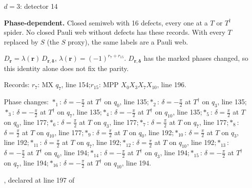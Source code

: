 \label{d3_det014}
{\Large $d=3$: detector 14}\par
\textbf{Phase-dependent.} Closed semiweb with 16 defects, every one at a $T$ or $T^\dagger$ spider. No closed Pauli web without defects has these records. With every $T$ replaced by $S$ (the $S$ proxy), the same labels are a Pauli web.
\begin{center}
\end{center}
\vspace{-1mm}
$D_{\boldsymbol r}=\lambda(\boldsymbol r)\,D_{\boldsymbol r,\boldsymbol\delta}$, \quad $\lambda(\boldsymbol r)=(-1)^{r_{7}+r_{15}}$. \qquad $D_{\boldsymbol r,\boldsymbol\delta}$ has the marked phases changed, so this identity alone does not fix the parity.
\par\smallskip\begin{minipage}{.98\linewidth}\small Records: $r_{7}$: MX $q_{7}$, line 154;\quad $r_{15}$: MPP $X_{0}X_{3}X_{7}X_{10}$, line 196.\end{minipage}
\par\smallskip\begin{minipage}{.98\linewidth}\small Phase changes: $\ast_{1}$: $\delta=-\frac{\pi}{2}$ at $T^\dagger$ on $q_{0}$, line 135;\quad $\ast_{2}$: $\delta=-\frac{\pi}{2}$ at $T^\dagger$ on $q_{3}$, line 135;\quad $\ast_{3}$: $\delta=-\frac{\pi}{2}$ at $T^\dagger$ on $q_{7}$, line 135;\quad $\ast_{4}$: $\delta=-\frac{\pi}{2}$ at $T^\dagger$ on $q_{10}$, line 135;\quad $\ast_{5}$: $\delta=\frac{\pi}{2}$ at $T$ on $q_{0}$, line 177;\quad $\ast_{6}$: $\delta=\frac{\pi}{2}$ at $T$ on $q_{3}$, line 177;\quad $\ast_{7}$: $\delta=\frac{\pi}{2}$ at $T$ on $q_{7}$, line 177;\quad $\ast_{8}$: $\delta=\frac{\pi}{2}$ at $T$ on $q_{10}$, line 177;\quad $\ast_{9}$: $\delta=\frac{\pi}{2}$ at $T$ on $q_{0}$, line 192;\quad $\ast_{10}$: $\delta=\frac{\pi}{2}$ at $T$ on $q_{3}$, line 192;\quad $\ast_{11}$: $\delta=\frac{\pi}{2}$ at $T$ on $q_{7}$, line 192;\quad $\ast_{12}$: $\delta=\frac{\pi}{2}$ at $T$ on $q_{10}$, line 192;\quad $\ast_{13}$: $\delta=-\frac{\pi}{2}$ at $T^\dagger$ on $q_{0}$, line 194;\quad $\ast_{14}$: $\delta=-\frac{\pi}{2}$ at $T^\dagger$ on $q_{3}$, line 194;\quad $\ast_{15}$: $\delta=-\frac{\pi}{2}$ at $T^\dagger$ on $q_{7}$, line 194;\quad $\ast_{16}$: $\delta=-\frac{\pi}{2}$ at $T^\dagger$ on $q_{10}$, line 194.\end{minipage}
\vfill
{\footnotesize\texttt{}, declared at line 197 of \texttt{}}
\newpage

